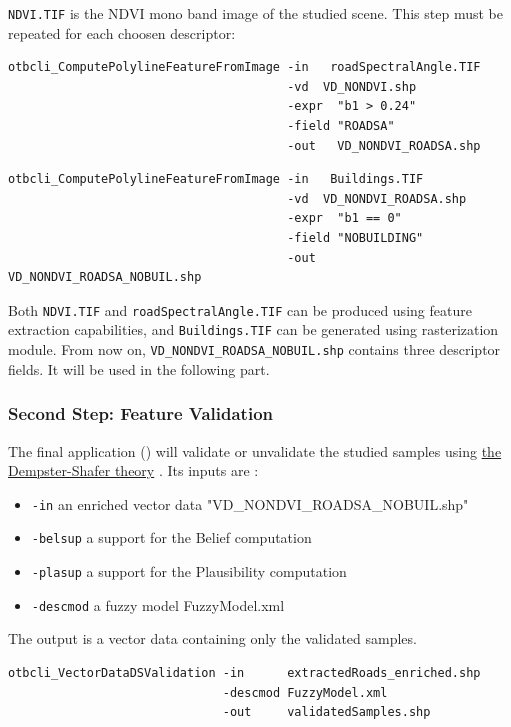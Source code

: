 \verb?NDVI.TIF? is the NDVI mono band image of the studied scene.
This step must be repeated for each choosen descriptor:

\begin{verbatim}
otbcli_ComputePolylineFeatureFromImage -in   roadSpectralAngle.TIF
                                       -vd  VD_NONDVI.shp
                                       -expr  "b1 > 0.24"
                                       -field "ROADSA"
                                       -out   VD_NONDVI_ROADSA.shp
\end{verbatim}

\begin{verbatim}
otbcli_ComputePolylineFeatureFromImage -in   Buildings.TIF
                                       -vd  VD_NONDVI_ROADSA.shp
                                       -expr  "b1 == 0"
                                       -field "NOBUILDING"
                                       -out   VD_NONDVI_ROADSA_NOBUIL.shp
\end{verbatim}

Both \verb?NDVI.TIF? and \verb?roadSpectralAngle.TIF? can be produced
using \mont feature extraction capabilities, and \verb?Buildings.TIF?
can be generated using \mont rasterization module. From now on,
\verb?VD_NONDVI_ROADSA_NOBUIL.shp? contains three descriptor fields.
It will be used in the following part.

\subsubsection{Second Step: Feature Validation}

The final application () will
validate or unvalidate the studied samples using
\href{http://en.wikipedia.org/wiki/Dempster\%E2\%80\%93Shafer_theory}{the Dempster-Shafer theory}
. Its inputs are :
\begin{itemize}
\item \verb?-in? an enriched vector data "VD\_NONDVI\_ROADSA\_NOBUIL.shp"
\item \verb?-belsup? a support for the Belief computation
\item \verb?-plasup? a support for the Plausibility computation
\item \verb?-descmod? a fuzzy model FuzzyModel.xml
\end{itemize}
The output is a vector data containing only the validated samples.

\begin{verbatim}
otbcli_VectorDataDSValidation -in      extractedRoads_enriched.shp
                              -descmod FuzzyModel.xml
                              -out     validatedSamples.shp
\end{verbatim}



